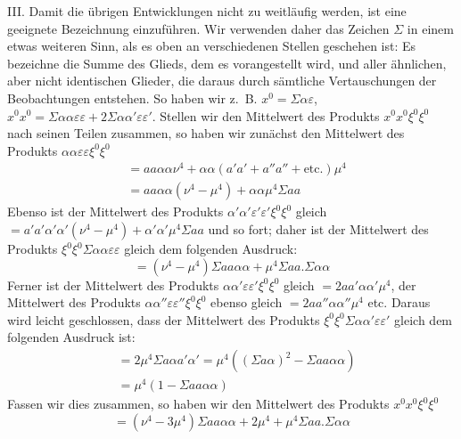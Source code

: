 III. Damit die übrigen Entwicklungen nicht zu weitläufig werden, ist eine geeignete Bezeichnung einzuführen. Wir verwenden daher das Zeichen \(\Sigma\) in einem etwas weiteren Sinn, als es oben an verschiedenen Stellen geschehen ist: Es bezeichne die Summe des Glieds, dem es vorangestellt wird, und aller ähnlichen, aber nicht identischen Glieder, die daraus durch sämtliche Vertauschungen der Beobachtungen entstehen. So haben wir z.\ B. \(x^0=\Sigma\alpha\varepsilon\), \(x^0x^0=\Sigma\alpha\alpha\varepsilon\varepsilon+2\Sigma\alpha\alpha'\varepsilon\varepsilon'\). Stellen wir den Mittelwert des Produkts \(x^0x^0\xi^0\xi^0\) nach seinen Teilen zusammen, so haben wir zunächst den Mittelwert des Produkts \(\alpha\alpha\varepsilon\varepsilon\xi^0\xi^0\)
\[
\begin{aligned}
&=aa\alpha\alpha\nu^4+\alpha\alpha(a'a'+a''a''+\text{etc.})\mu^4\\
&=aa\alpha\alpha(\nu^4-\mu^4)+\alpha\alpha\mu^4\Sigma aa
\end{aligned}
\]
Ebenso ist der Mittelwert des Produkts \(\alpha'\alpha'\varepsilon'\varepsilon'\xi^0\xi^0\) gleich \(=a'a'\alpha'\alpha'(\nu^4-\mu^4)+\alpha'\alpha'\mu^4\Sigma aa\) und so fort; daher ist der Mittelwert des Produkts \(\xi^0\xi^0\Sigma\alpha\alpha\varepsilon\varepsilon\) gleich dem folgenden Ausdruck:
\[
=(\nu^4-\mu^4)\Sigma aa\alpha\alpha+\mu^4\Sigma aa.\Sigma\alpha\alpha
\]
Ferner ist der Mittelwert des Produkts \(\alpha\alpha'\varepsilon\varepsilon'\xi^0\xi^0\) gleich \(=2aa'\alpha\alpha'\mu^4\), der Mittelwert des Produkts \(\alpha\alpha''\varepsilon\varepsilon''\xi^0\xi^0\) ebenso gleich \(=2aa''\alpha\alpha''\mu^4\) etc. Daraus wird leicht geschlossen, dass der Mittelwert des Produkts \(\xi^0\xi^0\Sigma\alpha\alpha'\varepsilon\varepsilon'\) gleich dem folgenden Ausdruck ist:
\[
\begin{aligned}
&=2\mu^4\Sigma a\alpha a'\alpha'=\mu^4((\Sigma a\alpha)^2-\Sigma aa\alpha\alpha)\\
&=\mu^4(1-\Sigma aa\alpha\alpha)
\end{aligned}
\]
Fassen wir dies zusammen, so haben wir den Mittelwert des Produkts \(x^0x^0\xi^0\xi^0\)
\[
=(\nu^4-3\mu^4)\Sigma aa\alpha\alpha+2\mu^4+\mu^4\Sigma aa.\Sigma\alpha\alpha
\]

